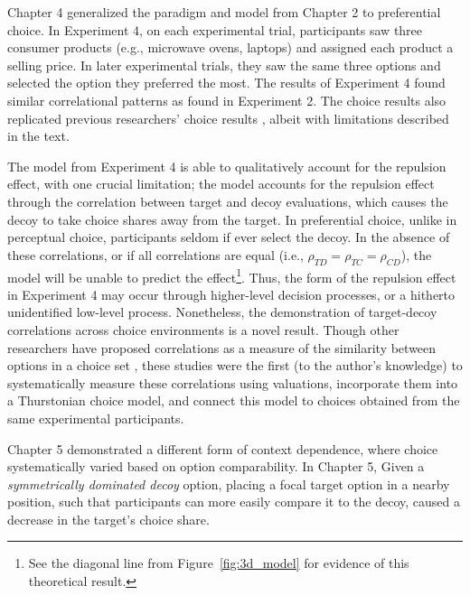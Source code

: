 Chapter 4 generalized the paradigm and model from Chapter 2 to preferential choice. In Experiment 4, on each experimental trial, participants saw three consumer products (e.g., microwave ovens, laptops) and assigned each product a selling price. In later experimental trials, they saw the same three options and selected the option they preferred the most. The results of Experiment 4 found similar correlational patterns as found in Experiment 2. The choice results also replicated previous researchers' choice results \parencite{banerjeeFactorsThatPromote2024}, albeit with limitations described in the text.

The model from Experiment 4 is able to qualitatively account for the repulsion effect, with one crucial limitation; the model accounts for the repulsion effect through the correlation between target and decoy evaluations, which causes the decoy to take choice shares away from the target. In preferential choice, unlike in perceptual choice, participants seldom if ever select the decoy. In the absence of these correlations, or if all correlations are equal (i.e., $\rho_{TD}=\rho_{TC}=\rho_{CD}$), the model will be unable to predict the effect\footnote{See the diagonal line from Figure~\ref{fig:3d_model} for evidence of this theoretical result.}. Thus, the form of the repulsion effect in Experiment 4 may occur through higher-level decision processes, or a hitherto unidentified low-level process. Nonetheless, the demonstration of target-decoy correlations across choice environments is a novel result. Though other researchers have proposed correlations as a measure of the similarity between options in a choice set \parencite{kamakura1984predicting,natenzon2019random}, these studies were the first (to the author's knowledge) to systematically measure these correlations using valuations, incorporate them into a Thurstonian choice model, and connect this model to choices obtained from the same experimental participants.

Chapter 5 demonstrated a different form of context dependence, where choice systematically varied based on option comparability. In Chapter 5, Given a \textit{symmetrically dominated decoy} option, placing a focal target option in a nearby position, such that participants can more easily compare it to the decoy, caused a decrease in the target's choice share. 

